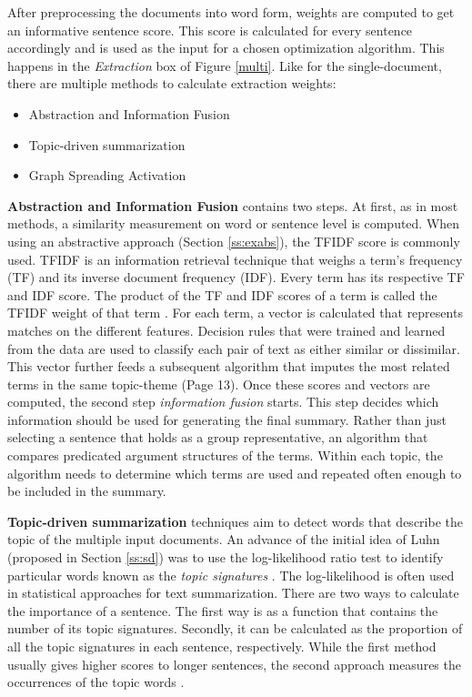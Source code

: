  
After preprocessing the documents into word form, weights are computed to get an informative sentence score. This score is calculated for every sentence accordingly and is used as the input for a chosen optimization algorithm. This happens in the \textit{Extraction} box of Figure \ref{multi}. Like for the single-document, there are multiple methods to calculate extraction weights:

\begin{itemize}
	\item Abstraction and Information Fusion
	\item Topic-driven summarization
	\item Graph Spreading Activation
\end{itemize}

\textbf{Abstraction and Information Fusion} contains two steps. At first, as in most methods, a similarity measurement on word or sentence level is computed. When using an abstractive approach (Section \ref{ss:exabs}), the TFIDF score is commonly used. TFIDF is an information retrieval technique that weighs a term’s frequency (TF) and its inverse document frequency (IDF). Every term has its respective TF and IDF score. The product of the TF and IDF scores of a term is called the TFIDF weight of that term \cite{Ramos_usingtf-idf}. For each term, a vector is calculated that represents matches on the different features. Decision rules that were trained and learned from the data are used to classify each pair of text as either similar or dissimilar. This vector further feeds a subsequent algorithm that imputes the most related terms in the same topic-theme \cite{Das07asurvey} (Page 13). Once these scores and vectors are computed, the second step \textit{information fusion} starts. This step decides which information should be used for generating the final summary. Rather than just selecting a sentence that holds as a group representative, an algorithm that compares predicated argument structures of the terms. Within each topic, the algorithm needs to determine which terms are used and repeated often enough to be included in the summary.

\textbf{Topic-driven summarization} techniques aim to detect words that describe the topic of the multiple input documents. An advance of the initial idea of Luhn (proposed in Section \ref{ss:sd}) was to use the log-likelihood ratio test to identify particular words known as the \textit{topic signatures} \cite{textmining1958}. The log-likelihood is often used in statistical approaches for text summarization. 
There are two ways to calculate the importance of a sentence. The first way is as a function that contains the number of its topic signatures. Secondly, it can be calculated as the proportion of all the topic signatures in each sentence, respectively. While the first method usually gives higher scores to longer sentences, the second approach measures the occurrences of the topic words \cite{dunning-1993-accurate}.

